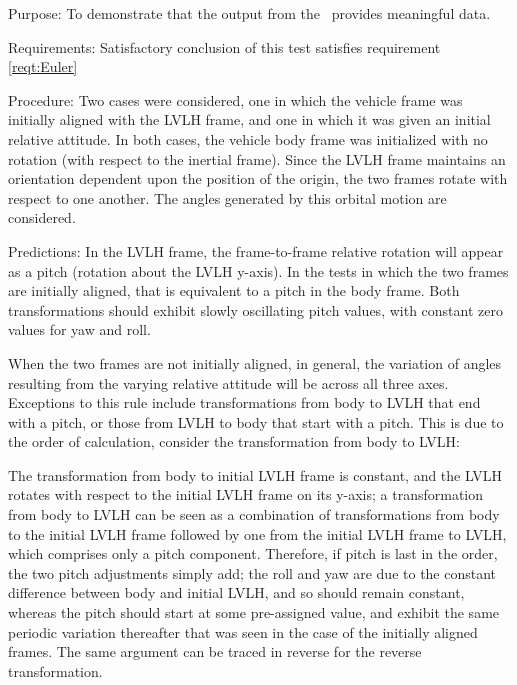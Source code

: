 \begin{description}
\item{Purpose:}\newline
To demonstrate that the output from the \EulerDesc\ provides meaningful data.

\item{Requirements:}\newline
Satisfactory conclusion of this test satisfies requirement \ref{reqt:Euler}

\item{Procedure:}\newline
Two cases were considered, one in which the vehicle frame was initially aligned with the LVLH frame, and one in which it was given an initial relative attitude.  In both cases, the vehicle body frame was initialized with no rotation (with respect to the inertial frame).  Since the LVLH frame maintains an orientation dependent upon the position of the origin, the two frames rotate with respect to one another.  The angles generated by this orbital motion are considered.

\item{Predictions:}  
In the LVLH frame, the frame-to-frame relative rotation will appear as a pitch (rotation about the LVLH y-axis).  In the tests in which the two frames are initially aligned, that is equivalent to a pitch in the body frame.  Both transformations should exhibit slowly oscillating pitch values, with constant zero values for yaw and roll.

When the two frames are not initially aligned, in general, the variation of angles resulting from the varying relative attitude will be across all three axes.  Exceptions to this rule include transformations from body to LVLH that end with a pitch, or those from LVLH to body that start with a pitch.  This is due to the order of calculation, consider the transformation from body to LVLH:

The transformation from body to initial LVLH frame is constant, and the LVLH rotates with respect to the initial LVLH frame on its y-axis; a transformation from body to LVLH can be seen as a combination of transformations from body to the initial LVLH frame followed by one from the initial LVLH frame to LVLH, which comprises only a pitch component.  Therefore, if pitch is last in the order, the two pitch adjustments simply add; the roll and yaw are due to the constant difference between body and initial LVLH, and so should remain constant, whereas the pitch should start at some pre-assigned value, and exhibit the same periodic variation thereafter that was seen in the case of the initially aligned frames.  The same argument can be traced in reverse for the reverse transformation.


\end{description}

